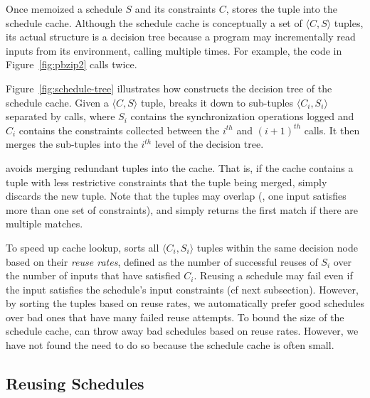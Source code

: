Once \tern memoized a schedule $S$ and its constraints $C$, \tern stores the
tuple into the schedule cache.  Although the schedule cache is
conceptually a set of $\langle C, S \rangle$ tuples, its actual structure
is a decision tree because a program may incrementally read inputs from
its environment, calling  multiple times.  For example, the
code in Figure~\ref{fig:pbzip2} calls  twice.

Figure~\ref{fig:schedule-tree} illustrates how \tern constructs the
decision tree of the schedule cache.  Given a $\langle C, S \rangle$
tuple, \tern breaks it down to sub-tuples $\langle C_i, S_i \rangle$
separated by  calls, where $S_i$ contains the
synchronization operations logged and $C_i$ contains the constraints
collected between the $i^{th}$ and $(i+1)^{th}$  calls.  It
then merges the sub-tuples into the $i^{th}$ level of the decision tree.

\tern avoids merging redundant tuples into the cache.  That is, if the
cache contains a tuple with less restrictive constraints that the tuple
being merged, \tern simply discards the new tuple.  Note that the tuples
may overlap (\ie, one input satisfies more than one set of constraints),
and \tern simply returns the first match if there are multiple matches.

To speed up cache lookup, \tern sorts all $\langle C_i, S_i \rangle$ tuples
within the same decision node based on their \emph{reuse rates}, defined
as the number of successful reuses of $S_i$ over the number of inputs that
have satisfied $C_i$.  Reusing a schedule may fail even if the input
satisfies the schedule's input constraints (cf next subsection).  However,
by sorting the tuples based on reuse rates, we automatically prefer good
schedules over bad ones that have many failed reuse attempts.  To bound
the size of the schedule cache, \tern can throw away bad schedules based on
reuse rates.  However, we have not found the need to do so because
the schedule cache is often small.



\subsection{Reusing Schedules} \label{sec:reuse-schedule}

